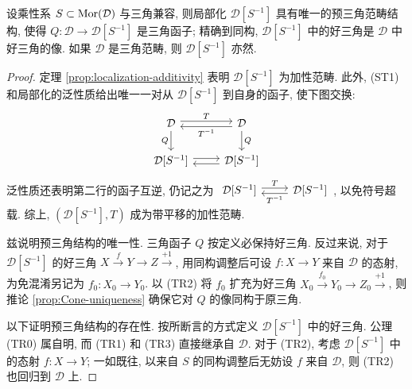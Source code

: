 \begin{proposition}\label{prop:localization-triangulated}
	设乘性系 $S \subset \operatorname{Mor}(\mathcal{D})$ 与三角兼容, 则局部化 $\mathcal{D}[S^{-1}]$ 具有唯一的预三角范畴结构, 使得 $Q: \mathcal{D} \to \mathcal{D}[S^{-1}]$ 是三角函子; 精确到同构, $\mathcal{D}[S^{-1}]$ 中的好三角是 $\mathcal{D}$ 中好三角的像. 如果 $\mathcal{D}$ 是三角范畴, 则 $\mathcal{D}[S^{-1}]$ 亦然.
\end{proposition}
\begin{proof}
	定理 \ref{prop:localization-additivity} 表明 $\mathcal{D}[S^{-1}]$ 为加性范畴. 此外, (ST1) 和局部化的泛性质给出唯一一对从 $\mathcal{D}[S^{-1}]$ 到自身的函子, 使下图交换:
	\[\begin{tikzcd}
		\mathcal{D} \arrow[r, "T", shift left] \arrow[d, "Q"'] & \mathcal{D} \arrow[l, "{T^{-1}}", shift left] \arrow[d, "Q"] \\
		\mathcal{D}[S^{-1}] \arrow[r, shift left] & \mathcal{D}[S^{-1}] \arrow[l, shift left]
	\end{tikzcd}\]
	泛性质还表明第二行的函子互逆, 仍记之为
	$\begin{tikzcd}
		\mathcal{D}[S^{-1}] \arrow[r, "T", shift left] & \mathcal{D}[S^{-1}] \arrow[l, "{T^{-1}}", shift left]
	\end{tikzcd}$,
	以免符号超载. 综上, $(\mathcal{D}[S^{-1}], T)$ 成为带平移的加性范畴.
	
	兹说明预三角结构的唯一性. 三角函子 $Q$ 按定义必保持好三角. 反过来说, 对于 $\mathcal{D}[S^{-1}]$ 的好三角 $X \xrightarrow{f} Y \to Z \xrightarrow{+1}$, 用同构调整后可设 $f: X \to Y$ 来自 $\mathcal{D}$ 的态射, 为免混淆另记为 $f_0: X_0 \to Y_0$. 以 (TR2) 将 $f_0$ 扩充为好三角 $X_0 \xrightarrow{f_0} Y_0 \to Z_0 \xrightarrow{+1}$, 则推论 \ref{prop:Cone-uniqueness} 确保它对 $Q$ 的像同构于原三角.
	
	以下证明预三角结构的存在性. 按所断言的方式定义 $\mathcal{D}[S^{-1}]$ 中的好三角. 公理 (TR0) 属自明, 而 (TR1) 和 (TR3) 直接继承自 $\mathcal{D}$. 对于 (TR2), 考虑 $\mathcal{D}[S^{-1}]$ 中的态射 $f: X \to Y$; 一如既往, 以来自 $S$ 的同构调整后无妨设 $f$ 来自 $\mathcal{D}$, 则 (TR2) 也回归到 $\mathcal{D}$ 上.
	

\end{proof}
